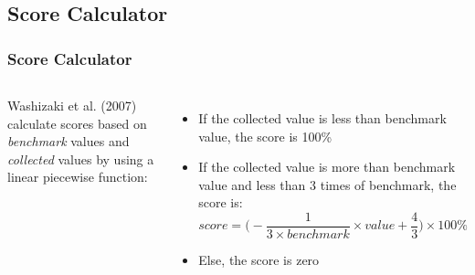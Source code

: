 \subsection{Score Calculator}
\begin{frame}
\frametitle{Score Calculator}

\begin{columns}
Washizaki et al. (2007) calculate scores based on \emph{benchmark} values and \emph{collected} values by using a linear piecewise function:
\begin{itemize}
  \item<1,4> If the collected value is less than benchmark value, the score is 100\%
  \item<2,4> If the collected value is more than benchmark value and less than 3 times of benchmark, the score is: $$score=\bigg(-\frac{1}{3 \times benchmark} \times value + \frac{4}{3}\bigg) \times 100\%$$
  \item<3,4> Else, the score is zero
\end{itemize}


\end{columns}

\end{frame}

